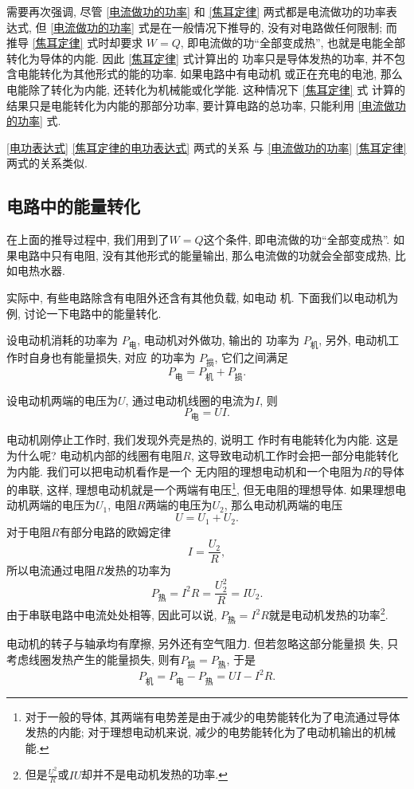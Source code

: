 \documentclass[11pt,a4paper]{ctexbook}
\begin{document}
需要再次强调, 尽管 \eqref{电流做功的功率} 和 \eqref{焦耳定律} 两式都是电流做功的功率表达式,
但 \eqref{电流做功的功率} 式是在一般情况下推导的, 没有对电路做任何限制; 而推导 \eqref{焦耳定律}
式时却要求 $W = Q$, 即电流做的功``全部变成热'', 也就是电能全部转化为导体的内能. 因此 \eqref{焦耳定律} 式计算出的
功率只是导体发热的功率, 并不包含电能转化为其他形式的能的功率. 如果电路中有电动机
或正在充电的电池, 那么电能除了转化为内能, 还转化为机械能或化学能. 这种情况下 \eqref{焦耳定律} 式
计算的结果只是电能转化为内能的那部分功率, 要计算电路的总功率, 只能利用 \eqref{电流做功的功率} 式.

\eqref{电功表达式} \eqref{焦耳定律的电功表达式} 两式的关系
与 \eqref{电流做功的功率} \eqref{焦耳定律} 两式的关系类似.

\subsection{电路中的能量转化}

在上面的推导过程中, 我们用到了$W = Q$这个条件, 即电流做的功``全部变成热''.
如果电路中只有电阻, 没有其他形式的能量输出, 那么电流做的功就会全部变成热, 比如电热水器.

实际中, 有些电路除含有电阻外还含有其他负载, 如电动
机. 下面我们以电动机为例, 讨论一下电路中的能量转化.

设电动机消耗的功率为 $P_\text{电}$, 电动机对外做功, 输出的
功率为 $P_\text{机}$, 另外, 电动机工作时自身也有能量损失, 对应
的功率为 $P_\text{损}$, 它们之间满足$$P_\text{电} = P_\text{机}+P_\text{损}.$$

设电动机两端的电压为$U$, 通过电动机线圈的电流为$I$, 则
$$P_\text{电} = UI.$$

电动机刚停止工作时, 我们发现外壳是热的, 说明工
作时有电能转化为内能. 这是为什么呢? 电动机内部的线圈有电阻$R$,
这导致电动机工作时会把一部分电能转化为内能. 我们可以把电动机看作是一个
无内阻的理想电动机和一个电阻为$R$的导体的串联, 这样, 理想电动机就是一个两端有电压\footnote{对于一般的导体, 其两端有电势差是由于减少的电势能转化为了电流通过导体发热的内能; 对于理想电动机来说, 减少的电势能转化为了电动机输出的机械能.}, 但无电阻的理想导体. 如果理想电动机两端的电压为$U_1$, 电阻$R$两端的电压为$U_2$, 那么电动机两端的电压$$U = U_1+U_2.$$
对于电阻$R$有部分电路的欧姆定律$$I = \frac{U_2}{R}, $$
所以电流通过电阻$R$发热的功率为$$P_\text{热} = I^2R = \frac{U_2^2}{R} = IU_2.$$
由于串联电路中电流处处相等, 因此可以说, $P_\text{热} = I^2R$就是电动机发热的功率\footnote{但是$\displaystyle\frac{U^2}{R}$或$IU$却并不是电动机发热的功率.}.

电动机的转子与轴承均有摩擦, 另外还有空气阻力. 但若忽略这部分能量损
失, 只考虑线圈发热产生的能量损失, 则有$P_\text{损} = P_\text{热}$,
于是$$P_\text{机} = P_\text{电} - P_\text{热} = UI - I^2R.$$
\end{document}
